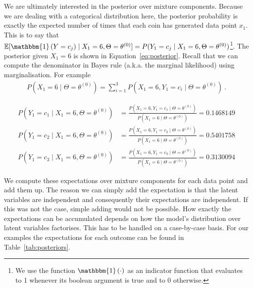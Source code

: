 \documentclass[11pt,leqno,a4paper]{report}\usepackage[]{graphicx}\usepackage[]{color}
\newcommand{\E}{\mathbb{E}}
\newcommand{\id}[1]{\mathbbm{1}\left(#1\right)}
\begin{document}
We are ultimately interested in the posterior over mixture components. Because we are dealing with a categorical
distribution here, the posterior probability is exactly the expected
number of times that each coin has generated data point $ x_{1} $. This is to say that
$\E[\id{Y=c_{j}}\mid X_{1}=6, \Theta = \theta^{(0)}] = P(Y_{1}=c_{j} \mid X_{1}=6, \Theta=\theta^{(0)}) $\footnote{We use
the function $ \id{\cdot} $ as an indicator function that evaluates to 1 whenever its boolean argument is true and to 0 otherwise.}. The
posterior given $ X_{1}=6 $ is shown in Equation~\eqref{eq:posterior}. Recall that we can compute the denominator in Bayes rule (a.k.a.
the marginal likelihood) using marginalisation. For example
\begin{align*}
P(X_1 = 6 \mid \Theta= \theta^{(0)}) = \sum_{i=1}^{3} P(X_{1}=6,Y_{1} = c_{i} \mid \Theta= \theta^{(0)}) \ .
\end{align*} 

\begin{align}\label{eq:posterior}
P(Y_{1} = c_{1} \mid X_{1}=6,\Theta= \theta^{(0)}) &= \frac{P(X_{1}=6,Y_{1} = c_{1} \mid \Theta= \theta^{(0)})}{P(X_1 = 6 \mid \Theta= \theta^{(0)})} = 0.1468149 \\
P(Y_{1} = c_{2} \mid X_{1}=6,\Theta= \theta^{(0)}) &= \frac{P(X_{1}=6,Y_{1} = c_{2} \mid \Theta= \theta^{(0)})}{P(X_1 = 6 \mid \Theta= \theta^{(0)})} = 0.5401758 \nonumber \\
P(Y_{1} = c_{3} \mid X_{1}=6,\Theta= \theta^{(0)}) &= \frac{P(X_{1}=6,Y_{1} = c_{3} \mid \Theta= \theta^{(0)})}{P(X_1 = 6 \mid \Theta= \theta^{(0)})} = 0.3130094 \nonumber
\end{align}

We compute these expectations over mixture components for each data point and add them up. The reason we can simply add the expectation is that
the latent variables are independent and consequently their expectations are independent. If this was not the case, simple adding would not
be possible. How exactly the expectations can be accumulated depends on how the model's distribution over latent variables factorises. This has to
be handled on a case-by-case basis. For our examples the expectations for each outcome can be found in Table~\ref{tab:posteriors}.
\end{document}
